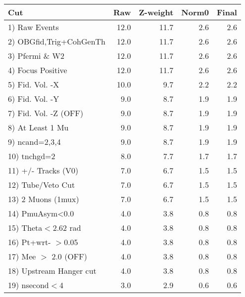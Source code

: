 \begin{table}[h!]\centering
 \begin{tabular}{||l||r|r|r|r||}
 \hline
 \hline
 Cut & Raw & Z-weight & Norm0 & Final \\
 \hline
  1) Raw Events           &        12.0 &        11.7 &         2.6 &         2.6 \\
  2) OBGfid,Trig+CohGenTh &        12.0 &        11.7 &         2.6 &         2.6 \\
  3) Pfermi \& W2         &        12.0 &        11.7 &         2.6 &         2.6 \\
  4) Focus Positive       &        12.0 &        11.7 &         2.6 &         2.6 \\
  5) Fid. Vol. -X         &        10.0 &         9.7 &         2.2 &         2.2 \\
  6) Fid. Vol. -Y         &         9.0 &         8.7 &         1.9 &         1.9 \\
  7) Fid. Vol. -Z (OFF)   &         9.0 &         8.7 &         1.9 &         1.9 \\
  8) At Least 1 Mu        &         9.0 &         8.7 &         1.9 &         1.9 \\
  9) ncand=2,3,4          &         9.0 &         8.7 &         1.9 &         1.9 \\
 10) tnchgd=2             &         8.0 &         7.7 &         1.7 &         1.7 \\
 11) +/- Tracks (V0)      &         7.0 &         6.7 &         1.5 &         1.5 \\
 12) Tube/Veto Cut        &         7.0 &         6.7 &         1.5 &         1.5 \\
 13) 2 Muons (1mux)       &         7.0 &         6.7 &         1.5 &         1.5 \\
 14) PmuAsym<0.0          &         4.0 &         3.8 &         0.8 &         0.8 \\
 15) Theta$<$2.62 rad     &         4.0 &         3.8 &         0.8 &         0.8 \\
 16) Pt+wrt- $>$0.05      &         4.0 &         3.8 &         0.8 &         0.8 \\
 17) Mee $>$ 2.0  (OFF)   &         4.0 &         3.8 &         0.8 &         0.8 \\
 18) Upstream Hanger cut  &         4.0 &         3.8 &         0.8 &         0.8 \\
 19) nsecond$<$4          &         3.0 &         2.9 &         0.6 &         0.6 \\

\end{tabular}
\end{table}
